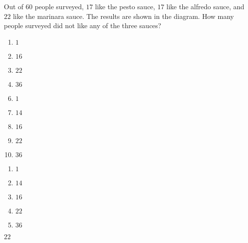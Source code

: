 
Out of $60$ people surveyed, $17$ like the pesto sauce, $17$ like the alfredo sauce, and $22$ like the marinara sauce.  The results are shown in the diagram.  How many people surveyed did not like any of the three sauces?



\ifsat
	\begin{enumerate}[label=\Alph*)]
		\item $1$
		\item $16$
		\item $22$%
		\item $36$
	\end{enumerate}
\else
\fi

\ifacteven
	\begin{enumerate}[label=\textbf{\Alph*.},itemsep=\fill,align=left]
		\setcounter{enumii}{5}
		\item $1$
		\item $14$
		\item $16$
		\addtocounter{enumii}{1}
		\item $22$%
		\item $36$
	\end{enumerate}
\else
\fi

\ifactodd
	\begin{enumerate}[label=\textbf{\Alph*.},itemsep=\fill,align=left]
		\item $1$
		\item $14$
		\item $16$
		\item $22$%
		\item $36$
	\end{enumerate}
\else
\fi

\ifgridin
 $22$%
		
\else
\fi

